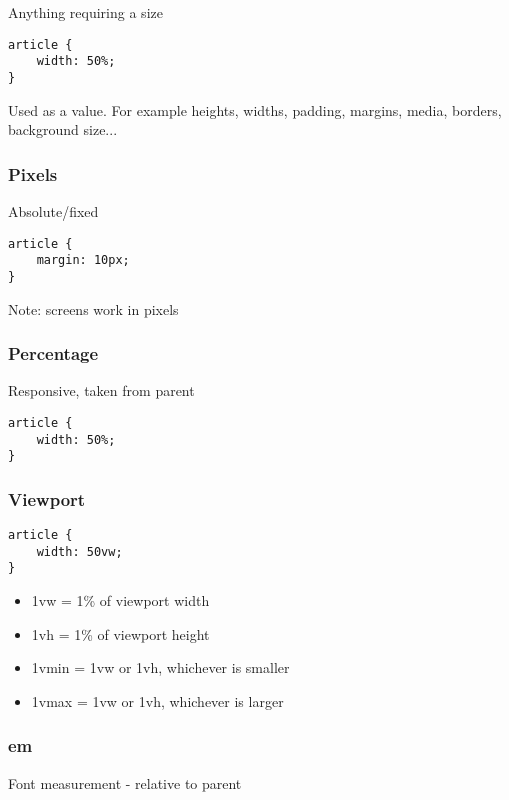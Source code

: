 Anything requiring a size


\begin{verbatim}
article {
    width: 50%;
}
\end{verbatim}

Used as a value. For example heights, widths, padding, margins, media, borders, background size...

\subsubsection{Pixels}

Absolute/fixed

\begin{verbatim}
article {
    margin: 10px;
}
\end{verbatim}

Note: screens work in pixels

\subsubsection{Percentage}

Responsive, taken from parent

\begin{verbatim}
article {
    width: 50%;
}
\end{verbatim}

\subsubsection{Viewport}

\begin{verbatim}
article {
    width: 50vw;
}
\end{verbatim}

\begin{itemize}
    \item 1vw = 1\% of viewport width
    \item 1vh = 1\% of viewport height
    \item 1vmin = 1vw or 1vh, whichever is smaller
    \item 1vmax = 1vw or 1vh, whichever is larger
\end{itemize}


\subsubsection{em}

Font measurement - relative to parent

